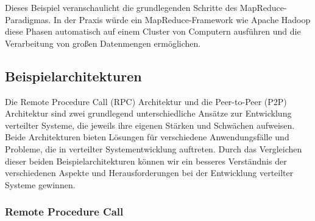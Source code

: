 \documentclass[../vs-script-first-v01.tex]{subfiles}
\begin{document}
Dieses Beispiel veranschaulicht die grundlegenden Schritte des MapReduce-Paradigmas. In der Praxis würde ein MapReduce-Framework wie Apache Hadoop diese Phasen automatisch auf einem Cluster von Computern ausführen und die Verarbeitung von großen Datenmengen ermöglichen.


\subsection{Beispielarchitekturen}
Die Remote Procedure Call (RPC) Architektur und die Peer-to-Peer (P2P) Architektur sind zwei grundlegend unterschiedliche Ansätze zur Entwicklung verteilter Systeme, die jeweils ihre eigenen Stärken und Schwächen aufweisen. Beide Architekturen bieten Lösungen für verschiedene Anwendungsfälle und Probleme, die in verteilter Systementwicklung auftreten. Durch das Vergleichen dieser beiden Beispielarchitekturen können wir ein besseres Verständnis der verschiedenen Aspekte und Herausforderungen bei der Entwicklung verteilter Systeme gewinnen.
\subsubsection{Remote Procedure Call}
\end{document}

